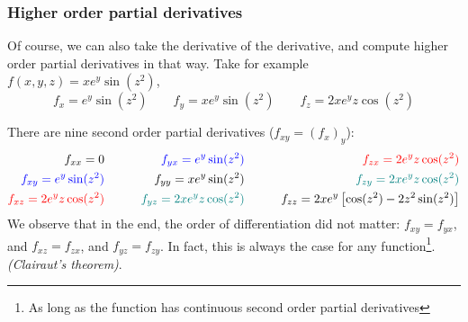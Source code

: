 \begin{frame}
\frametitle{Higher order partial derivatives}

Of course, we can also take the derivative of the derivative, and compute higher order partial derivatives in that way. Take for example $f(x,y,z)=xe^y\sin(z^2)$,
\[f_x = e^y\sin(z^2)\qquad f_y=xe^y\sin(z^2)\qquad f_z=2xe^y z\cos(z^2)\]

\pause There are nine second order partial derivatives ($f_{xy}=(f_x)_y$):
{\footnotesize\begin{align*}
    f_{xx} = 0 \qquad&& \textcolor{blue}{f_{yx} = e^y\sin(z^2)} \qquad&& \textcolor{red}{f_{zx} = 2e^y z\cos(z^2)}\\
    \textcolor{blue}{f_{xy} = e^y\sin(z^2)} \qquad&& f_{yy} = xe^y\sin(z^2)\qquad&& \textcolor{teal}{f_{zy} =  2xe^y z\cos(z^2)} \\
    \textcolor{red}{f_{xz} = 2e^y z\cos(z^2)}\qquad&& \textcolor{teal}{f_{yz} = 2xe^y z\cos(z^2)} \qquad&& f_{zz} = 2xe^y\left[\cos(z^2)-2z^2\sin(z^2)\right]
\end{align*}}
\pause We observe that in the end, the order of differentiation did not matter: $f_{xy}=f_{yx}$, and $f_{xz}=f_{zx}$, and $f_{yz}=f_{zy}$. In fact, this is always the case for any function\footnote{As long as the function has continuous second order partial derivatives}. \textit{(Clairaut's theorem)}.

\end{frame}



